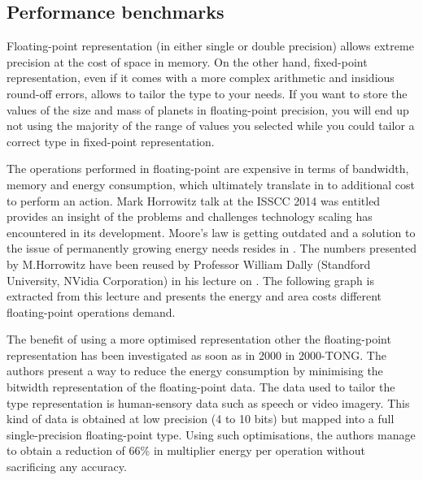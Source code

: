 \subsection{Performance benchmarks}

Floating-point representation (in either single or double precision) allows extreme precision at the cost of space in memory. On the other hand, fixed-point representation, even if it comes with a more complex arithmetic and insidious round-off errors, allows to tailor the type to your needs. If you want to store the values of the size and mass of planets in floating-point precision, you will end up not using the majority of the range of values you selected while you could tailor a correct type in fixed-point representation.

The operations performed in floating-point are expensive in terms of bandwidth, memory and energy consumption, which ultimately translate in to additional cost to perform an action. Mark Horrowitz talk at the ISSCC 2014 was entitled  provides an insight of the problems and challenges technology scaling has encountered in its development. Moore's law is getting outdated and a solution to the issue of permanently growing energy needs resides in . The numbers presented by M.Horrowitz have been reused by Professor William Dally (Standford University, NVidia Corporation) in his lecture on  \cite{Nips2015}. The following graph is extracted from this lecture and presents the energy and area costs different floating-point operations demand.


The benefit of using a more optimised representation other the floating-point representation has been investigated as soon as in 2000 in 2000-TONG. The authors present a way to reduce the energy consumption by minimising the bitwidth representation of the floating-point data. The data used to tailor the type representation is human-sensory data such as speech or video imagery. This kind of data is obtained at low precision (4 to 10 bits) but mapped into a full single-precision floating-point type. Using such optimisations, the authors manage to obtain a reduction of 66\% in multiplier energy per operation without sacrificing any accuracy.


